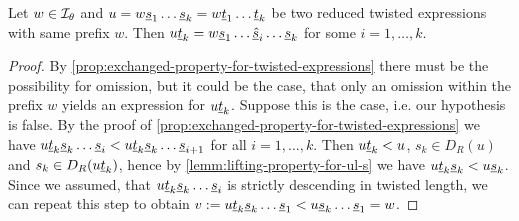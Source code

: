 \begin{lemm}
	Let $w \in \mathcal{I}_{\theta}$ and $u = w \underline{s}_1 \ldots \underline{s}_k = w \underline{t}_1 \ldots \underline{t}_k$ be two reduced twisted expressions with same prefix $w$. Then $u \underline{t}_k = w \underline{s}_1 \ldots \underline{\hat s}_i \ldots \underline{s}_k$ for some $i = 1,\ldots,k$.

	\begin{proof}
		By \ref{prop:exchanged-property-for-twisted-expressions} there must be the possibility for omission, but it could be the case, that only an omission within the prefix $w$ yields an expression for $u \underline{t}_k$. Suppose this is the case, i.e. our hypothesis is false. By the proof of \ref{prop:exchanged-property-for-twisted-expressions} we have $u \underline{t}_k \underline{s}_k \ldots \underline{s}_i < u \underline{t}_k \underline{s}_k \ldots \underline{s}_{i+1}$ for all $i = 1,\ldots,k$. Then $u \underline{t}_k < u$, $s_k \in D_R(u)$ and $s_k \in D_R(u \underline{t}_k)$, hence by \ref{lemm:lifting-property-for-ul-s} we have $u \underline{t}_k \underline{s}_k < u \underline{s}_k$. Since we assumed, that $u \underline{t}_k \underline{s}_k \ldots \underline{s}_i$ is strictly descending in twisted length, we can repeat this step to obtain $v := u \underline{t}_k \underline{s}_k \ldots \underline{s}_1 < u \underline{s}_k \ldots \underline{s}_1 = w$.
		\todo
	\end{proof}
\end{lemm}


